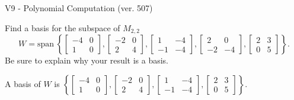 \begin{exercise}
  \begin{exerciseTitle}V9 - Polynomial Computation (ver. 507)\end{exerciseTitle}
  \begin{exerciseStatement}
    Find a basis for the subspace of \(M_{2,2}\) 
\[W=\mathrm{span}\ \left\{\left[\begin{array}{cc}
-4 & 0 \\
1 & 0
\end{array}\right] , \left[\begin{array}{cc}
-2 & 0 \\
2 & 4
\end{array}\right] , \left[\begin{array}{cc}
1 & -4 \\
-1 & -4
\end{array}\right] , \left[\begin{array}{cc}
2 & 0 \\
-2 & -4
\end{array}\right] , \left[\begin{array}{cc}
2 & 3 \\
0 & 5
\end{array}\right]\right\}.\]
 Be sure to explain why your result is a basis.


  \end{exerciseStatement}
  \begin{exerciseAnswer}
   A basis of \(W\) is  \(\left\{\left[\begin{array}{cc}
-4 & 0 \\
1 & 0
\end{array}\right] , \left[\begin{array}{cc}
-2 & 0 \\
2 & 4
\end{array}\right] , \left[\begin{array}{cc}
1 & -4 \\
-1 & -4
\end{array}\right] , \left[\begin{array}{cc}
2 & 3 \\
0 & 5
\end{array}\right]\right\}\).
  


  \end{exerciseAnswer}
\end{exercise}
